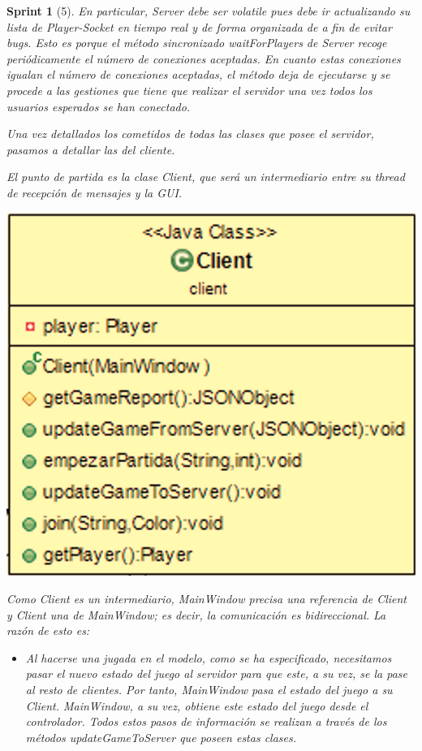 \documentclass{article}
\theoremstyle{break}
\newtheorem*{sprint}{Sprint}
\begin{document}
\begin{sprint}[5]
En particular, Server debe ser volatile pues debe ir actualizando su lista de Player-Socket en tiempo real y de forma organizada de a fin de evitar bugs. Esto es porque el método sincronizado waitForPlayers de Server recoge periódicamente el número de conexiones aceptadas. En cuanto estas conexiones igualan el número de conexiones aceptadas, el método deja de ejecutarse y se procede a las gestiones que tiene que realizar el servidor una vez todos los usuarios esperados se han conectado.

Una vez detallados los cometidos de todas las clases que posee el servidor, pasamos a detallar las del cliente.

El punto de partida es la clase Client, que será un intermediario entre su thread de recepción de mensajes y la GUI.

\begin{center}
\includegraphics[scale=0.3]{Client-sprint5.png} 
\end{center}

Como Client es un intermediario, MainWindow precisa una referencia de Client y Client una de MainWindow; es decir, la comunicación es bidireccional. La razón de esto es:

\begin{itemize}
\item Al hacerse una jugada en el modelo, como se ha especificado, necesitamos pasar el nuevo estado del juego al servidor para que este, a su vez, se la pase al resto de clientes. Por tanto, MainWindow pasa el estado del juego a su Client. MainWindow, a su vez, obtiene este estado del juego desde el controlador. Todos estos pasos de información se realizan a través de los métodos updateGameToServer que poseen estas clases.


\end{itemize}
\end{sprint}
\end{document}
